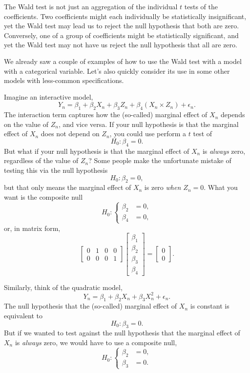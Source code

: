 \documentclass[12pt,oneside,openany]{book}
\begin{document}
The Wald test is not just an aggregation of the individual \(t\) tests
of the coefficients. Two coefficients might each individually be
statistically insignificant, yet the Wald test may lead us to reject the
null hypothesis that both are zero. Conversely, one of a group of
coefficients might be statistically significant, and yet the Wald test
may not have us reject the null hypothesis that all are zero.

We already saw a couple of examples of how to use the Wald test with a
model with a categorical variable. Let's also quickly consider its use
in some other models with less-common specifications.

Imagine an interactive model, \[
Y_n = \beta_1 + \beta_2 X_n + \beta_3 Z_n + \beta_4 (X_n \times Z_n) + \epsilon_n.
\] The interaction term captures how the (so-called) marginal effect of
\(X_n\) depends on the value of \(Z_n\), and vice versa. If your null
hypothesis is that the marginal effect of \(X_n\) does not depend on
\(Z_n\), you could use perform a \(t\) test of \[
H_0 : \beta_4 = 0.
\] But what if your null hypothesis is that the marginal effect of
\(X_n\) is \emph{always} zero, regardless of the value of \(Z_n\)? Some
people make the unfortunate mistake of testing this via the null
hypothesis \[
H_0 : \beta_2 = 0,
\] but that only means the marginal effect of \(X_n\) is zero \emph{when
\(Z_n = 0\)}. What you want is the composite null \[
H_0 : \left\{ \begin{aligned}
  \beta_2 &= 0, \\
  \beta_4 &= 0,
\end{aligned} \right.
\] or, in matrix form, \[
\begin{bmatrix}
  0 & 1 & 0 & 0 \\
  0 & 0 & 0 & 1
\end{bmatrix}
\begin{bmatrix}
  \beta_1 \\ \beta_2 \\ \beta_3 \\ \beta_4
\end{bmatrix}
=
\begin{bmatrix}
  0 \\ 0
\end{bmatrix}.
\]

Similarly, think of the quadratic model, \[
Y_n = \beta_1 + \beta_2 X_n + \beta_3 X_n^2 + \epsilon_n.
\] The null hypothesis that the (so-called) marginal effect of \(X_n\)
is constant is equivalent to \[
H_0 : \beta_3 = 0.
\] But if we wanted to test against the null hypothesis that the
marginal effect of \(X_n\) is \emph{always} zero, we would have to use a
composite null, \[
H_0 : \left\{ \begin{aligned}
  \beta_2 &= 0, \\
  \beta_3 &= 0.
\end{aligned} \right.
\]
\end{document}
